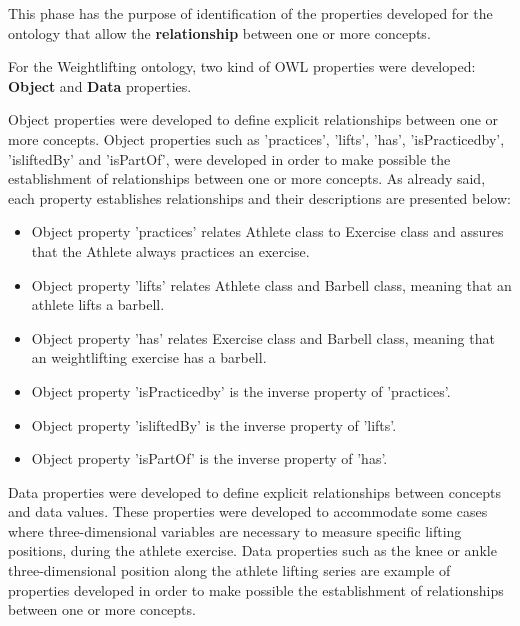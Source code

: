 This phase has the purpose of identification of the properties developed for the ontology that allow the \textbf{relationship} between one or more concepts.

For the Weightlifting ontology, two kind of OWL properties were developed: \textbf{Object} and \textbf{Data} properties. 

Object properties were developed to define explicit relationships between one or more concepts. Object properties such as 'practices', 'lifts', 'has', 'isPracticedby', 'isliftedBy' and 'isPartOf', were developed in order to make possible the establishment of relationships between one or more concepts. As already said, each property establishes relationships and their descriptions are presented below: 

\begin{itemize}  
	\item Object property 'practices' relates Athlete class to Exercise class and assures that the Athlete always practices an exercise.
	\item Object property 'lifts' relates Athlete class and Barbell class, meaning that an athlete lifts a barbell.
	\item Object property 'has' relates Exercise class and Barbell class, meaning that an weightlifting exercise has a barbell.
	\item Object property 'isPracticedby' is the inverse property of 'practices'.
	\item Object property 'isliftedBy' is the inverse property of 'lifts'.
	\item Object property 'isPartOf' is the inverse property of 'has'.
\end{itemize}

Data properties were developed to define explicit relationships between concepts and data values. These properties were developed to accommodate some cases where three-dimensional variables are necessary to measure specific lifting positions, during the athlete exercise. Data properties such as the knee or ankle three-dimensional position along the athlete lifting series are example of properties developed in order to make possible the establishment of relationships between one or more concepts.
